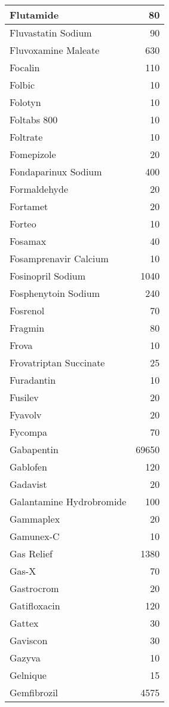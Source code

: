 \documentclass[
]{article}
\begin{document}
\begin{table}
\begin{tabular}[t]{l|r}
\hline
Flutamide & 80\\
\hline
Fluvastatin Sodium & 90\\
\hline
Fluvoxamine Maleate & 630\\
\hline
Focalin & 110\\
\hline
Folbic & 10\\
\hline
Folotyn & 10\\
\hline
Foltabs 800 & 10\\
\hline
Foltrate & 10\\
\hline
Fomepizole & 20\\
\hline
Fondaparinux Sodium & 400\\
\hline
Formaldehyde & 20\\
\hline
Fortamet & 20\\
\hline
Forteo & 10\\
\hline
Fosamax & 40\\
\hline
Fosamprenavir Calcium & 10\\
\hline
Fosinopril Sodium & 1040\\
\hline
Fosphenytoin Sodium & 240\\
\hline
Fosrenol & 70\\
\hline
Fragmin & 80\\
\hline
Frova & 10\\
\hline
Frovatriptan Succinate & 25\\
\hline
Furadantin & 10\\
\hline
Fusilev & 20\\
\hline
Fyavolv & 20\\
\hline
Fycompa & 70\\
\hline
Gabapentin & 69650\\
\hline
Gablofen & 120\\
\hline
Gadavist & 20\\
\hline
Galantamine Hydrobromide & 100\\
\hline
Gammaplex & 20\\
\hline
Gamunex-C & 10\\
\hline
Gas Relief & 1380\\
\hline
Gas-X & 70\\
\hline
Gastrocrom & 20\\
\hline
Gatifloxacin & 120\\
\hline
Gattex & 30\\
\hline
Gaviscon & 30\\
\hline
Gazyva & 10\\
\hline
Gelnique & 15\\
\hline
Gemfibrozil & 4575\\

\end{tabular}
\end{table}
\end{document}
